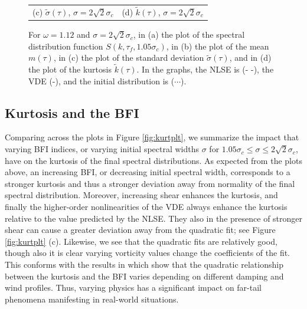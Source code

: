 \documentclass[a4paper,11pt]{article}
\begin{document}
\begin{figure}[!ht]
\begin{tabular}{cc}
(c) $\tilde{\sigma}(\tau)$, $\sigma = 2\sqrt{2}\sigma_{c}$ & (d) $\tilde{k}(\tau)$, $\sigma = 2\sqrt{2}\sigma_{c}$
\end{tabular}
\caption{For $\omega=1.12$ and $\sigma=2\sqrt{2} \sigma_{c}$, in (a) the plot of the spectral distribution function $S(k,\tau_{f},1.05\sigma_{c})$, in (b) the plot of the mean $m(\tau)$, in (c) the plot of the standard deviation $\tilde{\sigma}(\tau)$, and in (d) the plot of the kurtosis $\tilde{k}(\tau)$.  In the graphs, the NLSE is (- -), the VDE (-), and the initial distribution is ($\cdots$).}
\label{fig:stbleom1wide}
\end{figure}

\subsection*{Kurtosis and the BFI}
Comparing across the plots in Figure \ref{fig:kurtplt}, we summarize the impact that varying BFI indices, or varying initial spectral widths $\sigma$ for $1.05\sigma_{c}\leq \sigma \leq 2\sqrt{2}\sigma_{c}$, have on the kurtosis of the final spectral distributions.  As expected from the plots above, an increasing BFI, or decreasing initial spectral width, corresponds to a stronger kurtosis and thus a stronger deviation away from normality of the final spectral distribution.  Moreover, increasing shear enhances the kurtosis, and finally the higher-order nonlinearities of the VDE always enhance the kurtosis relative to the value predicted by the NLSE.  They also in the presence of stronger shear can cause a greater deviation away from the quadratic fit; see Figure \ref{fig:kurtplt} (c).  Likewise, we see that the quadratic fits are relatively good, though also it is clear varying vorticity values change the coefficients of the fit.  This conforms with the results in \cite{eeltink} which show that the quadratic relationship between the kurtosis and the BFI varies depending on different damping and wind profiles.  Thus, varying physics has a significant impact on far-tail phenomena manifesting in real-world situations.  
\end{document}
